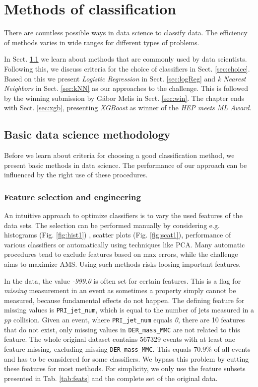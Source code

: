 
\section{Methods of classification}\label{ch:methods}
There are countless possible ways in data science to classify data. The efficiency of methods varies in wide ranges for different types of problems.

In Sect. \ref{sec:basic} we learn about methods that are commonly used by data scientists. Following this, we discuss criteria for the choice of classifiers in Sect. \ref{sec:choice}. Based on this we present \emph{Logistic Regression} in Sect. \ref{sec:logReg} and \emph{k Nearest Neighbors} in Sect. \ref{sec:kNN} as our approaches to the challenge. This is followed by the winning submission by Gábor Melis in Sect. \ref{sec:win}. The chapter ends with Sect. \ref{sec:xgb}, presenting \emph{XGBoost} as winner of the \emph{HEP meets ML Award}.

\subsection{Basic data science methodology}\label{sec:basic}
Before we learn about criteria for choosing a good classification method, we present basic methods in data science. The performance of our approach can be influenced by the right use of these procedures.

\subsubsection{Feature selection and engineering}
An intuitive approach to optimize classifiers is to vary the used features of the data sets. The selection can be performed manually by considering e.g. histograms (Fig. \ref{fig:hist1}) , scatter plots (Fig. \ref{fig:scat1}), performance of various classifiers or automatically using techniques like PCA. Many automatic procedures tend to exclude features based on max errors, while the challenge aims to maximize AMS. Using such methods risks loosing important features\cite{blog}.

In the data, the value \emph{-999.0} is often set for certain features. This is a flag for \emph{missing} measurement in an event as sometimes a property simply cannot be measured, because fundamental effects do not happen.
The defining feature for missing values is \texttt{PRI\_jet\_num}, which is equal to the number of jets measured in a \emph{pp} collision. Given an event, where \texttt{PRI\_jet\_num} equals \emph{0}, there are 10 features that do not exist, only missing values in \texttt{DER\_mass\_MMC} are not related to this feature. The whole original dataset contains 567329 events with at least one feature missing, excluding missing \texttt{DER\_mass\_MMC}. This equals 70.9\% of all events and has to be considered for some classifiers. We bypass this problem by cutting these features for most methods. For simplicity, we only use the feature subsets presented in Tab. \ref{tab:feats} and the complete set of the original data.

